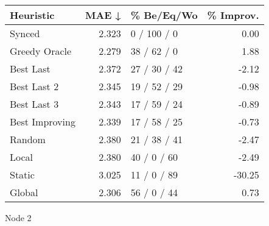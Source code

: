 \begin{tabular}{lrlr}
\toprule
\textbf{Heuristic} & \textbf{MAE ↓} & \textbf{\% Be/Eq/Wo} & \textbf{\% Improv.} \\
\midrule
            Synced &          2.323 &          0 / 100 / 0 &                0.00 \\
     Greedy Oracle &          2.279 &          38 / 62 / 0 &                1.88 \\
         Best Last &          2.372 &         27 / 30 / 42 &               -2.12 \\
       Best Last 2 &          2.345 &         19 / 52 / 29 &               -0.98 \\
       Best Last 3 &          2.343 &         17 / 59 / 24 &               -0.89 \\
    Best Improving &          2.339 &         17 / 58 / 25 &               -0.73 \\
            Random &          2.380 &         21 / 38 / 41 &               -2.47 \\
             Local &          2.380 &          40 / 0 / 60 &               -2.49 \\
            Static &          3.025 &          11 / 0 / 89 &              -30.25 \\
            Global &          2.306 &          56 / 0 / 44 &                0.73 \\
\bottomrule
\end{tabular}
\caption{Node 2}
\label{tab:hr_iid_lr05_le1_bs4_2}
